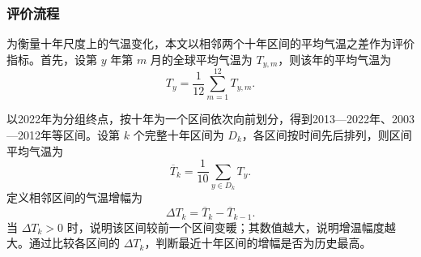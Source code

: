 \subsubsection{评价流程}

为衡量十年尺度上的气温变化，本文以相邻两个十年区间的平均气温之差作为评价指标。首先，设第 $y$ 年第 $m$ 月的全球平均气温为 $T_{y,m}$，则该年的平均气温为
\begin{equation}
    T_y=\frac{1}{12}\sum_{m=1}^{12}T_{y,m}.
\end{equation}

以2022年为分组终点，按十年为一个区间依次向前划分，得到2013---2022年、2003---2012年等区间。设第 $k$ 个完整十年区间为 $D_k$，各区间按时间先后排列，则区间平均气温为
\begin{equation}
    \overline{T}_k=\frac{1}{10}\sum_{y\in D_k}T_y.
\end{equation}
定义相邻区间的气温增幅为
\begin{equation}
    \Delta T_k=\overline{T}_k-\overline{T}_{k-1}.
    \label{eq:q1a-decadal-increase}
\end{equation}
当 $\Delta T_k>0$ 时，说明该区间较前一个区间变暖；其数值越大，说明增温幅度越大。通过比较各区间的 $\Delta T_k$，判断最近十年区间的增幅是否为历史最高。
